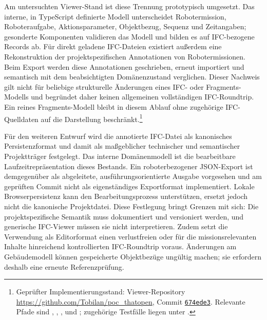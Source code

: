Am untersuchten Viewer-Stand ist diese Trennung prototypisch umgesetzt. Das interne, in TypeScript definierte Modell
unterscheidet Robotermission, Roboteraufgabe, Aktionsparameter, Objektbezug, Sequenz und Zeitangaben; gesonderte
Komponenten validieren das Modell und bilden es auf IFC-bezogene Records ab. Für direkt geladene IFC-Dateien existiert
außerdem eine Rekonstruktion der projektspezifischen Annotationen von Robotermissionen. Beim Export werden diese
Annotationen geschrieben, erneut importiert und semantisch mit dem beabsichtigten Domänenzustand verglichen. Dieser
Nachweis gilt nicht für beliebige strukturelle Änderungen eines IFC- oder Fragments-Modells und begründet daher keinen
allgemeinen vollständigen IFC-Roundtrip. Ein reines Fragments-Modell bleibt in diesem Ablauf ohne zugehörige
IFC-Quelldaten auf die Darstellung beschränkt.\footnote{Geprüfter Implementierungsstand: Viewer-Repository
\url{https://github.com/Tobilan/poc_thatopen}, Commit
\href{https://github.com/Tobilan/poc_thatopen/commit/674ede3bf2e7e6cf466bc4c16fe06c90fbb1753c}{\texttt{674ede3}}.
Relevante Pfade sind , ,
,  und
; zugehörige Testfälle liegen unter
.}

Für den weiteren Entwurf wird die annotierte IFC-Datei als kanonisches Persistenzformat und damit als maßgeblicher
technischer und semantischer Projektträger festgelegt. Das interne Domänenmodell ist die bearbeitbare
Laufzeitrepräsentation dieses Bestands. Ein roboterbezogener JSON-Export ist demgegenüber als abgeleitete,
ausführungsorientierte Ausgabe vorgesehen und am geprüften Commit nicht als eigenständiges Exportformat implementiert.
Lokale Browserpersistenz kann den Bearbeitungsprozess unterstützen, ersetzt jedoch nicht die kanonische Projektdatei.
Diese Festlegung bringt Grenzen mit sich: Die projektspezifische Semantik muss dokumentiert und versioniert werden, und
generische IFC-Viewer müssen sie nicht interpretieren. Zudem setzt die Verwendung als Editorformat einen verlustfreien
oder für die missionsrelevanten Inhalte hinreichend kontrollierten IFC-Roundtrip voraus. Änderungen am Gebäudemodell
können gespeicherte Objektbezüge ungültig machen; sie erfordern deshalb eine erneute Referenzprüfung.

